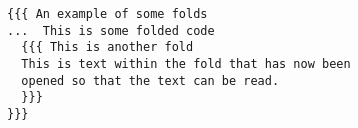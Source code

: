 \begin{verbatim}
{{{ An example of some folds
...  This is some folded code
  {{{ This is another fold
  This is text within the fold that has now been
  opened so that the text can be read.
  }}}
}}}
\end{verbatim}



